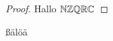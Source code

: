 \documentclass{article}
\author{Max Mustermann (212125465) \\ Mr Maxmeier (5289612)}
\begin{document}
  \maketitle

  \begin{proof} Hallo $\mathbb{N} \mathbb{Z} \mathbb{Q} \mathbb{R} \mathbb{C}$ \end{proof}
    ßälöä
\end{document}
